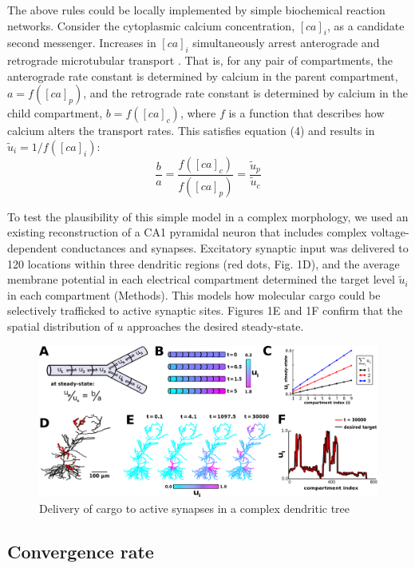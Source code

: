 \documentclass[fleqn,10pt]{wlpeerj}
\begin{document}
The above rules could be locally implemented by simple biochemical reaction networks. Consider the cytoplasmic calcium concentration, $[ca]_i$, as a candidate second messenger. Increases in $[ca]_i$ simultaneously arrest anterograde and retrograde microtubular transport \citep{Wang_2009}. That is, for any pair of compartments, the anterograde rate constant is determined by calcium in the parent compartment, $a = f([ca]_p)$,  and the retrograde rate constant is determined by calcium in the child compartment, $b = f([ca]_c)$, where $f$ is a function that describes how calcium alters the transport rates. This satisfies equation (4) and results in $\tilde{u}_i = 1/f([ca]_i)$:
$$
\frac{b}{a} = \frac{f([ca]_c)}{f([ca]_p)} = \frac{\tilde{u}_p}{\tilde{u}_c}
$$

To test the plausibility of this simple model in a complex morphology, we used an existing reconstruction of a CA1 pyramidal neuron \citep{Migliore_2012} that includes complex voltage-dependent conductances and synapses. Excitatory synaptic input was delivered to 120 locations within three dendritic regions (red dots, Fig. 1D), and the average membrane potential in each electrical compartment determined the target level $\tilde{u}_i$ in each compartment (Methods). This models how molecular cargo could be selectively trafficked to active synaptic sites. Figures 1E and 1F confirm that the spatial distribution of $u$ approaches the desired steady-state.

\begin{figure}[h!]
\begin{center}
\includegraphics[width=1\columnwidth]{01_mass_action.png}
\caption{Delivery of cargo to active synapses in a complex dendritic tree}
\end{center}
\end{figure}

\subsection*{Convergence rate}
\end{document}
